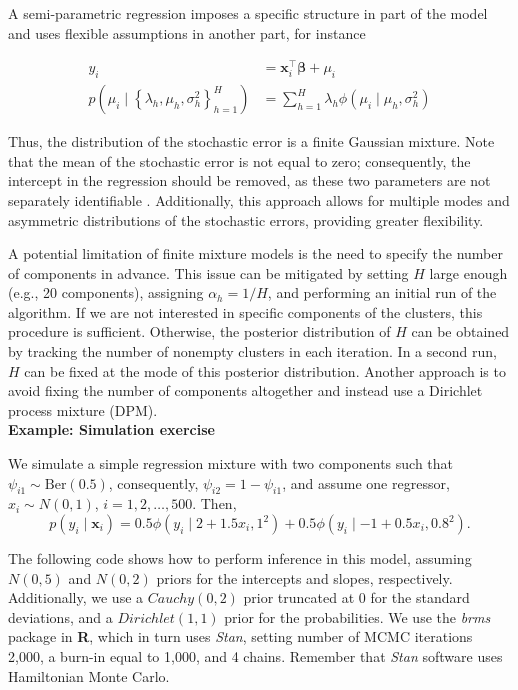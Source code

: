 A semi-parametric regression imposes a specific structure in part of the model and uses flexible assumptions in another part, for instance

\begin{align*}
	y_i&=\bm{x}_i^{\top}\bm{\beta}+\mu_i\\
	p(\mu_i \mid \left\{\lambda_h,\mu_h,\sigma_h^2\right\}_{h=1}^H)&=\sum_{h=1}^H\lambda_h\phi(\mu_i\mid \mu_h,\sigma_h^2) 
\end{align*}

Thus, the distribution of the stochastic error is a finite Gaussian mixture. Note that the mean of the stochastic error is not equal to zero; consequently, the intercept in the regression should be removed, as these two parameters are not separately identifiable \cite{van2011bayesian}. Additionally, this approach allows for multiple modes and asymmetric distributions of the stochastic errors, providing greater flexibility.

A potential limitation of finite mixture models is the need to specify the number of components in advance. This issue can be mitigated by setting $H$ large enough (e.g., 20 components), assigning $\alpha_h = 1/H$, and performing an initial run of the algorithm. If we are not interested in specific components of the clusters, this procedure is sufficient. Otherwise, the posterior distribution of $H$ can be obtained by tracking the number of nonempty clusters in each iteration. In a second run, $H$ can be fixed at the mode of this posterior distribution. Another approach is to avoid fixing the number of components altogether and instead use a Dirichlet process mixture (DPM).\\

\textbf{Example: Simulation exercise}

We simulate a simple regression mixture with two components such that $\psi_{i1}\sim \text{Ber}(0.5)$, consequently, $\psi_{i2}=1-\psi_{i1}$, and assume one regressor, $x_i\sim N(0,1)$, $i=1,2,\dots,500$. Then, 
$$p(y_i \mid \bm{x}_i) = 
0.5 \phi(y_i \mid 2+1.5x_i,1^2)+0.5 \phi(y_i \mid -1+0.5x_i,0.8^2).$$

The following code shows how to perform inference in this model, assuming $N(0,5)$ and $N(0,2)$ priors for the intercepts and slopes, respectively. Additionally, we use a $Cauchy(0,2)$ prior truncated at 0 for the standard deviations, and a $Dirichlet(1,1)$ prior for the probabilities. We use the \textit{brms} package in \textbf{R}, which in turn uses \textit{Stan}, setting number of MCMC iterations 2,000, a burn-in equal to 1,000, and 4 chains. Remember that \textit{Stan} software uses Hamiltonian Monte Carlo. 


